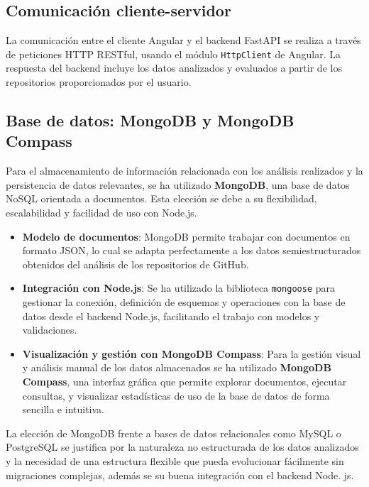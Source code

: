 \subsection{Comunicación cliente-servidor}

La comunicación entre el cliente Angular y el backend FastAPI se realiza a través de peticiones HTTP RESTful, usando el módulo \texttt{HttpClient} de Angular. La respuesta del backend incluye los datos analizados y evaluados a partir de los repositorios proporcionados por el usuario.

\subsection{Base de datos: MongoDB y MongoDB Compass}

Para el almacenamiento de información relacionada con los análisis realizados y la persistencia de datos relevantes, se ha utilizado \textbf{MongoDB}, una base de datos NoSQL orientada a documentos. Esta elección se debe a su flexibilidad, escalabilidad y facilidad de uso con Node.js.

\begin{itemize}
  \item \textbf{Modelo de documentos}: MongoDB permite trabajar con documentos en formato JSON, lo cual se adapta perfectamente a los datos semiestructurados obtenidos del análisis de los repositorios de GitHub.
  
  \item \textbf{Integración con Node.js}: Se ha utilizado la biblioteca \texttt{mongoose} para gestionar la conexión, definición de esquemas y operaciones con la base de datos desde el backend Node.js, facilitando el trabajo con modelos y validaciones.
  
  \item \textbf{Visualización y gestión con MongoDB Compass}: Para la gestión visual y análisis manual de los datos almacenados se ha utilizado \textbf{MongoDB Compass}, una interfaz gráfica que permite explorar documentos, ejecutar consultas, y visualizar estadísticas de uso de la base de datos de forma sencilla e intuitiva.
  
\end{itemize}

La elección de MongoDB frente a bases de datos relacionales como MySQL o PostgreSQL se justifica por la naturaleza no estructurada de los datos analizados y la necesidad de una estructura flexible que pueda evolucionar fácilmente sin migraciones complejas, además se su buena integración con el backend Node. js.


